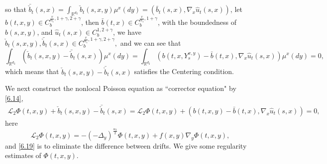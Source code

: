 \documentclass[11pt,reqno]{amsart}
\numberwithin{equation}{section}
\begin{document}
so that $\bar{\check{b}}_{t}(s,x)=\int_{\mathbb{R}^{d_{2}}}\check{b}_{t}(s,x,y)\mu^{x}(dy)=(\bar{b}_{t}(s,x),\nabla_{x}\hat{u}_{t}(s,x))$, let $b(t,x,y)\in C_{b}^{\frac{v}{\alpha_{1}},1+\gamma,2+\gamma}$, then $\bar{b}(t,x)\in C_{b}^{\frac{v}{\alpha_{1}},1+\gamma} $, with the boundedness of $b(s,x,y)$, and $\hat{u}_{t}(s,x)\in  C^{1,2+\gamma}_{b}$, we have
$ \check{b}_{t}(s,x,y),\bar{\check{b}}_{t}(s,x)\in C_{b}^{\frac{v}{\alpha_{1}},1+\gamma,2+\gamma},$ and we can see that $$\int_{\mathbb{R}^{ d_{2}}}(\check{b}_{t}(s,x,y)- \bar{\check{b}}_{t}(s,x))\mu^{x}(dy)=\int_{\mathbb{R}^{ d_{2}}}(b(t,x,Y_{s}^{x,y})-\bar{b}(t,x),\nabla_{x}\hat{u}_{t}(s,x))\mu^{x}(dy)=0,$$ which means that $\check{b}_{t}(s,x,y)- \bar{\check{b}}_{t}(s,x)$ satisfies the Centering condition.


We next construct the nonlocal Poisson equation as   ``corrector equation" by \eqref{6.14},
\begin{equation}\label{6.19}
	\begin{split}
			\mathcal{L}_{2}\Phi(t,x,y)+ \check{b}_{t}(s,x,y)-\bar{\check{b}}_{t}(s,x)=\mathcal{L}_{2}\Phi(t,x,y)+ (b(t,x,y)-\bar{b}(t,x),\nabla_{x}\hat{u}_{t}(s,x))=0,
	\end{split}
\end{equation}
here 
\begin{equation}\label{6.18}
	\mathcal{L}_{2}\Phi(t,x,y)=-(-\Delta_{y})^{\frac{\alpha_{2}}{2}}\Phi(t,x,y)+f(x,y)\nabla_{y}\Phi(t,x,y),
\end{equation}
and \eqref{6.19} is to eliminate the difference between drifts.  We give some regularity estimates of $\Phi(t,x,y)$.
\end{document}

